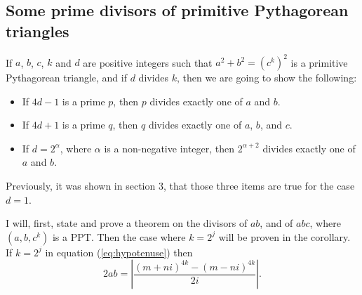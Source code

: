 \documentclass{article}
\theoremstyle{definition}
\begin{document}
\subsection{Some prime divisors of primitive Pythagorean triangles}

If \(a\), \(b\), \(c\), \(k\) and \(d\) are positive integers such that \( a^2+b^2 = (c^k)^2\) is a primitive Pythagorean triangle, and if \(d\) divides \(k\), then we are going to show the following:

\begin{itemize}
\item If \(4d-1\) is a prime \(p\), then \(p\) divides exactly one of \(a\) and \(b\).
\item If \(4d+1\) is a prime \(q\), then \(q\) divides exactly one of \(a\), \(b\), and \(c\).
\item If \(d=2^{\alpha}\), where \(\alpha\) is a non-negative integer, then \(2^{\alpha+2}\) divides exactly one of \(a\) and \(b\).
\end{itemize}

Previously, it was shown in section 3, that those three items are true for the case \(d=1\).

I will, first, state and prove a theorem on the divisors of \(ab\), and of \(abc\), where \((a,b,c^k)\) is a PPT. Then the case where \(k=2^j\) will be proven in the corollary. If \(k=2^j\) in equation (\ref{eq:hypotenuse}) then \[2ab = \left\lvert \frac{(m+ni)^{4k}-(m-ni)^{4k}}{2i} \right\rvert.\]
\end{document}
